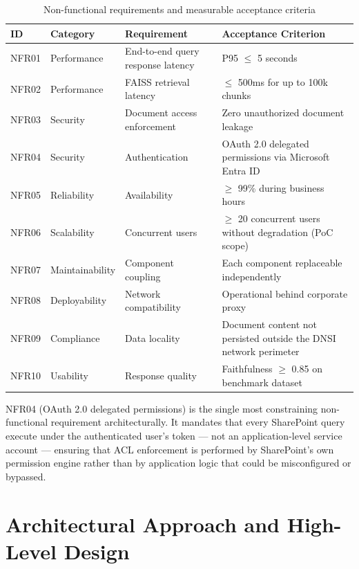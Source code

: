 \begin{table}[H]
\centering
\caption{Non-functional requirements and measurable acceptance criteria}
\label{tab:nonfunctional-requirements}
\begin{tabularx}{\textwidth}{@{}llXl@{}}
\toprule
\textbf{ID} & \textbf{Category} & \textbf{Requirement} & \textbf{Acceptance Criterion} \\
\midrule
NFR01 & Performance & End-to-end query response latency & P95 $\leq$ 5 seconds \\
NFR02 & Performance & FAISS retrieval latency & $\leq$ 500ms for up to 100k chunks \\
NFR03 & Security & Document access enforcement & Zero unauthorized document leakage \\
NFR04 & Security & Authentication & OAuth 2.0 delegated permissions via Microsoft Entra ID \\
NFR05 & Reliability & Availability & $\geq$ 99\% during business hours \\
NFR06 & Scalability & Concurrent users & $\geq$ 20 concurrent users without degradation (PoC scope) \\
NFR07 & Maintainability & Component coupling & Each component replaceable independently \\
NFR08 & Deployability & Network compatibility & Operational behind corporate proxy \\
NFR09 & Compliance & Data locality & Document content not persisted outside the DNSI network perimeter \\
NFR10 & Usability & Response quality & Faithfulness $\geq$ 0.85 on benchmark dataset \\
\bottomrule
\end{tabularx}
\end{table}

NFR04 (OAuth 2.0 delegated permissions) is the single most constraining non-functional requirement architecturally. It mandates that every SharePoint query execute under the authenticated user's token --- not an application-level service account --- ensuring that ACL enforcement is performed by SharePoint's own permission engine rather than by application logic that could be misconfigured or bypassed.

\section{Architectural Approach and High-Level Design}
\label{sec:arch-overview}

